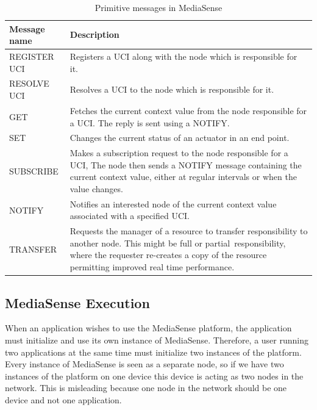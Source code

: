 \begin{center}
\begin{table}
    \begin{tabularx}{\textwidth}{ | l | X |}
    \hline
    Message name 		& 		Description \\ \hline
	REGISTER UCI 		& 		Registers a UCI along with the node which is responsible for it. \\ \hline
	RESOLVE UCI 		& 		Resolves a UCI to the node which is responsible for it. \\ \hline
	GET 				& 		Fetches the current context value from the node responsible for a UCI. The reply is sent using a NOTIFY. \\ \hline
	SET 				& 		Changes the current status of an actuator in an end point. \\ \hline
	SUBSCRIBE 			& 		Makes a subscription request to the node responsible for a UCI, The node then sends a NOTIFY message containing the current context value, either at regular intervals or when the value changes. \\ \hline
	NOTIFY 				& 		Notifies an interested node of the current context value associated with a specified UCI. \\ \hline
	TRANSFER 			& 		Requests the manager of a resource to transfer responsibility to another node. This might be full or partial responsibility, where the requester re-creates a copy of the resource permitting improved real time performance. \\ \hline
    \end{tabularx}
	\caption{Primitive messages in MediaSense}
	\label{tab:table}
\end{table}
\end{center}


\subsection{MediaSense Execution}
When an application wishes to use the MediaSense platform, the application must initialize and use its own instance of MediaSense. Therefore, a user running two applications at the same time must initialize two instances of the platform. Every instance of MediaSense is seen as a separate node, so if we have two instances of the platform on one device this device is acting as two nodes in the network. This is misleading because one node in the network should be one device and not one application.

